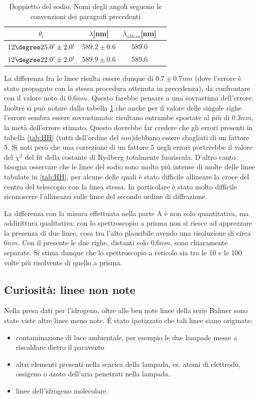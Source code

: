 \documentclass[a4paper,10pt]{article}
\begin{document}
{{{{{{{\begin{table}[H]
	\centering
	\begin{tabular}{c|c|c|c}
		$\theta_i$ & $\lambda$[nm] & $\lambda_{attesa}$[nm]  \\
		\hline
  $ 12\degree 25.0' \pm 2.0 ' $ & $ 589.2 \pm 0.6 $ & $ 589.0 $ \\
  $ 12\degree 22.0' \pm 2.0 ' $ & $ 589.9 \pm 0.6 $ & $ 589.6 $ \\
\end{tabular}
	\caption{Doppietto del sodio. Nomi degli angoli seguono le convenzioni dei paragrafi precedenti}
	\label{tab:NaR}
\end{table}

La differenza fra le linee risulta essere dunque di $0.7\pm 0.7 nm$ (dove l'errore è stato propagato con la stessa procedura ottenuta in precedenza), da confrontare con il valore noto di $0.6 nm$. Questo farebbe pensare a una sovrastima dell'errore. Inoltre si può notare dalla tabella \ref{tab:NaR} che anche per il valore delle singole righe l'errore sembra essere sovrastimato: risultano entrambe spostate al più di $0.3 nm$, la metà dell'errore stimato.
Questo dovrebbe far credere che gli errori presenti in tabella \ref{tab:HH} (tutti dell'ordine del $nm$)debbano essere sbagliati di un fattore 5. Si noti però che una correzione di un fattore 5 negli errori porterebbe il valore del $\chi^2$ del fit della costante di Rydberg totalmente fuoriscala. D'altro canto bisogna osservare che le linee del sodio sono molto più intense di molte delle linee tabulate in \ref{tab:HH}, per alcune delle quali è stato difficile allineare la croce del centro del telescopio con la linea stessa. In particolare è stato molto difficile riconoscere l'allinearsi sulle linee del secondo ordine di diffrazione.


La differenza con la misura effettuata nella parte A è non solo quantitativa, ma addirittura qualitativa: con lo spettroscopio a prisma non si riesce ad apprezzare la presenza di due linee, cosa tra l'alto plausibile avendo una risoluzione di circa $6 nm$. Con il presente le due righe, distanti solo $0.6 nm$, sono chiaramente separate. Si stima dunque che lo spettroscopio a reticolo sia tra le 10 e le 100 volte più risolvente di quello a prisma.  




\label{Curiosità: linee non note}\subsection{Curiosità: linee non note}
Nella presa dati per l'idrogeno, oltre alle ben note linee della serie Balmer sono state viste altre linee meno note. \'E stato ipotizzato che tali linee siano originate:
\begin{itemize}
\item contaminazione di luce ambientale, per esempio le due lampade messe a riscaldare dietro il paravento
\item altri elementi presenti nella scarica della lampada, es. atomi di elettrodo, ossigeno o azoto dell'aria penetrati nella lampada.
\item linee dell'idrogeno molecolare.
\end{itemize}

}}}}}}}
\end{document}
